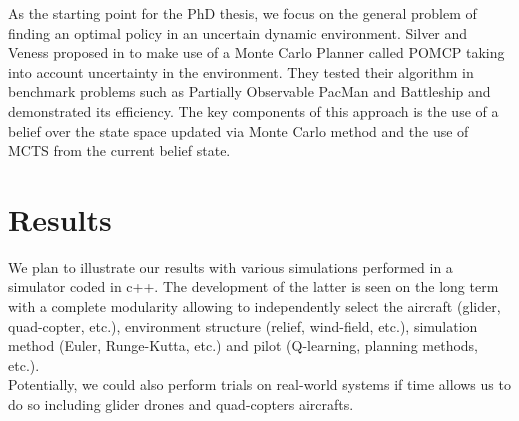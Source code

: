 \documentclass[a4paper]{article}
\begin{document}
As the starting point for the PhD thesis, we focus on the general problem of finding an optimal policy in an uncertain dynamic environment. Silver and Veness proposed in \cite{silver2010monte} to make use of a Monte Carlo Planner called POMCP taking into account uncertainty in the environment. They tested their algorithm in benchmark problems such as Partially Observable PacMan and Battleship and demonstrated its efficiency. The key components of this approach is the use of a belief over the state space updated via Monte Carlo method and the use of MCTS from the current belief state.

\section{Results}
We plan to illustrate our results with various simulations performed in a simulator coded in c++. The development of the latter is seen on the long term with a complete modularity allowing to independently select the aircraft (glider, quad-copter, etc.), environment structure (relief, wind-field, etc.), simulation method (Euler, Runge-Kutta, etc.) and pilot (Q-learning, planning methods, etc.).
\\

\noindent Potentially, we could also perform trials on real-world systems if time allows us to do so including glider drones and quad-copters aircrafts.

\cite{keller2013trial}
\cite{keller2012prost}


\end{document}
